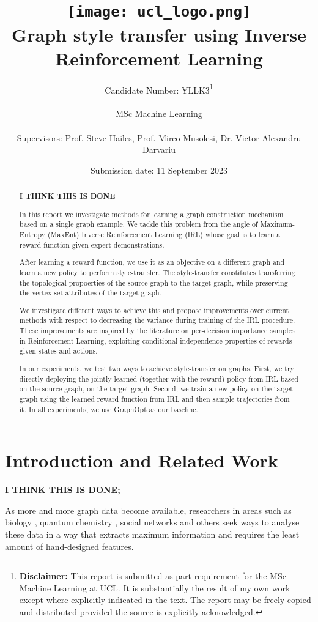 \documentclass{report}
\title{
  { \texttt{[image: ucl\_logo.png]}}\\
  {{\Huge Graph style transfer using Inverse Reinforcement Learning}}\\
}
\date{Submission date: 11 September 2023}
\author{
  Candidate Number: YLLK3\thanks{
      {\bf Disclaimer:}
      This report is submitted as part requirement 
      for the MSc Machine Learning at UCL. It is
      substantially the result of my own work except 
      where explicitly indicated in the text.
      The report may be freely copied and 
      distributed provided the source is explicitly acknowledged.
    }
    \\ \\
  MSc Machine Learning\\ \\
  Supervisors: Prof. Steve Hailes, Prof. Mirco Musolesi, Dr. Victor-Alexandru Darvariu
}
\numberwithin{equation}{section}
\numberwithin{figure}{section}
\numberwithin{table}{section}
\numberwithin{algorithm}{section}
\begin{document}
\onehalfspacing
\maketitle

\begin{abstract}
  \textbf{I THINK THIS IS DONE}


  In this report we investigate methods for learning a graph 
  construction mechanism based on a single graph example. We 
  tackle this problem from the angle of Maximum-Entropy (MaxEnt) 
  Inverse Reinforcement Learning 
  (IRL) whose goal is to learn a reward function given 
  expert demonstrations. 
  
  After learning a reward function, we use it as an 
  objective on a different graph and learn a 
  new policy to perform style-transfer.  
  The style-transfer constitutes transferring the topological 
  propoerties of the source graph to the target graph, while 
  preserving the vertex set attributes of the target graph.
  
  We investigate different ways to achieve this and 
  propose improvements over current methods with respect 
  to decreasing the variance during training of the IRL procedure. 
  These improvements are inspired by the 
  literature on per-decision importance samples 
  in Reinforcement Learning, exploiting conditional independence 
  properties of rewards given states and actions.
  
  In our experiments, we test two ways to achieve style-transfer 
  on graphs. First, we try  
  directly deploying the 
  jointly learned (together with the reward)  
  policy from IRL based on the source graph, 
  on the target graph. Second, 
  we train 
  a new policy on the target graph using the learned reward 
  function from IRL and then sample trajectories from it. 
  In all experiments, we use GraphOpt as our baseline. 
\end{abstract}
\tableofcontents
\setcounter{page}{1}

\chapter{Introduction and Related Work}\label{chap:intro}
\textbf{I THINK THIS IS DONE;}

As more and more graph data become available, researchers in 
areas such as biology \citep{VGAEDisease}, quantum chemistry 
\citep{MPNNs}, social networks \citep{SocialNets} and others 
seek ways to analyse these data in a way that extracts 
maximum information 
and requires the least amount of hand-designed features.
\end{document}
